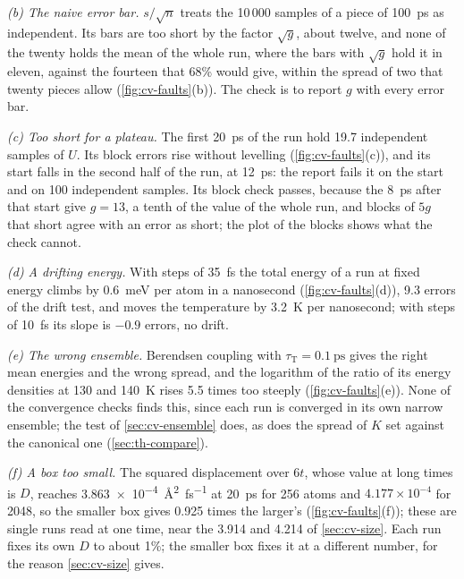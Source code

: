 \emph{(b) The naive error bar.} $s/\sqrt n$ treats the 10\,000 samples of
a piece of \SI{100}{\pico\second} as independent. Its bars are too short
by the factor $\sqrt g$, about twelve, and none of the twenty holds the
mean of the whole run, where the bars with $\sqrt g$ hold it in eleven,
against the fourteen that 68\% would give, within the spread of two that
twenty pieces allow (\cref{fig:cv-faults}(b)). The check is to report $g$ with every error
bar.

\emph{(c) Too short for a plateau.} The first \SI{20}{\pico\second} of the
run hold 19.7 independent samples of $U$. Its block errors rise without
levelling (\cref{fig:cv-faults}(c)), and its start falls in the second
half of the run, at \SI{12}{\pico\second}: the report fails it on the start
and on 100 independent samples. Its block check passes, because the
\SI{8}{\pico\second} after that start give $g = 13$, a tenth of the value
of the whole run, and blocks of $5g$ that short agree with an error as
short; the plot of the blocks shows what the check cannot.

\emph{(d) A drifting energy.} With steps of \SI{35}{\femto\second} the
total energy of a run at fixed energy climbs by
\SI{0.6}{\milli\electronvolt} per atom in a nanosecond
(\cref{fig:cv-faults}(d)), 9.3 errors of the drift test, and moves the
temperature by \SI{3.2}{\kelvin} per nanosecond; with steps of
\SI{10}{\femto\second} its slope is $-0.9$ errors, no drift.

\emph{(e) The wrong ensemble.} Berendsen coupling with $\tau_{\mathrm T} =
\SI{0.1}{\pico\second}$ gives the right mean energies and the wrong
spread, and the logarithm of the ratio of its energy densities at 130 and
\SI{140}{\kelvin} rises 5.5 times too steeply (\cref{fig:cv-faults}(e)).
None of the convergence checks finds this, since each run is converged in
its own narrow ensemble; the test of \cref{sec:cv-ensemble} does, as does
the spread of $K$ set against the canonical one (\cref{sec:th-compare}).

\emph{(f) A box too small.} The squared displacement over $6t$, whose
value at long times is $D$, reaches \SI{3.863e-4}{\angstrom\squared\per
\femto\second} at \SI{20}{\pico\second} for 256 atoms and $4.177\times
10^{-4}$ for 2048, so the smaller box gives 0.925 times the larger's
(\cref{fig:cv-faults}(f)); these are single runs read at one time, near
the 3.914 and 4.214 of \cref{sec:cv-size}. Each run fixes its own $D$
to about 1\%; the smaller box fixes it at a different number, for the
reason \cref{sec:cv-size} gives.

